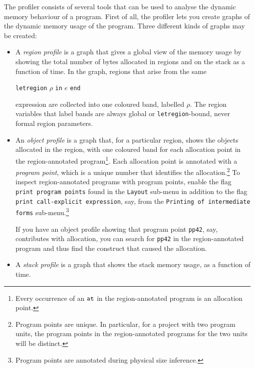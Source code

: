 \documentclass[12pt]{book}
\begin{document}
The profiler consists of several tools that can be used to analyse the
dynamic memory behaviour of a program. First of all, the profiler lets
you create graphs of the dynamic memory usage of the program. Three
different kinds of graphs may be created:
\begin{itemize}
\item A 
  {\em region profile\/} is a graph that gives a global view of the
  memory usage by showing the total number of bytes allocated in
  regions and on the stack as a function of time. In the graph,
  regions that arise from the same
  \begin{center}
    \texttt{letregion} $\rho$ \texttt{in} $e$ \texttt{end}
  \end{center}
  expression are collected into one coloured band, labelled $\rho$. The
  region variables that label bands are always global or {\tt letregion}-bound,
  never formal region parameters.
\item An 
  {\em object profile\/} is a graph that, for a particular region,
  shows the objects allocated in the region, with one coloured band
  for each allocation point in the region-annotated
  program\footnote{Every occurrence of an $\mathbin{\hbox{\tt at}}$ in the
    region-annotated program is an allocation point.}. Each allocation
  point is annotated with a
  {\em program point}, which is a unique number that identifies the
  allocation.\footnote{Program points are unique. In particular, for a
    project with two program units, the program points in the
    region-annotated programs for the two units will be distinct.}  To
  inspect region-annotated programs with program points, enable the
  flag {\tt print program points} found in the {\tt Layout} sub-menu
  in addition to the flag {\tt print call-explicit expression}, say,
  from the {\tt Printing of intermediate forms}
  sub-menu.\footnote{Program points are annotated during physical size
    inference.}
  
  If you have an object profile showing that program point
  \texttt{pp42}, say, contributes with allocation, you can search for
  \texttt{pp42} in the region-annotated program and thus find the
  construct that caused the allocation.
\item A 
  {\em stack profile\/} is a graph that shows the stack memory usage,
  as a function of time.
\end{itemize}
  
\end{document}
